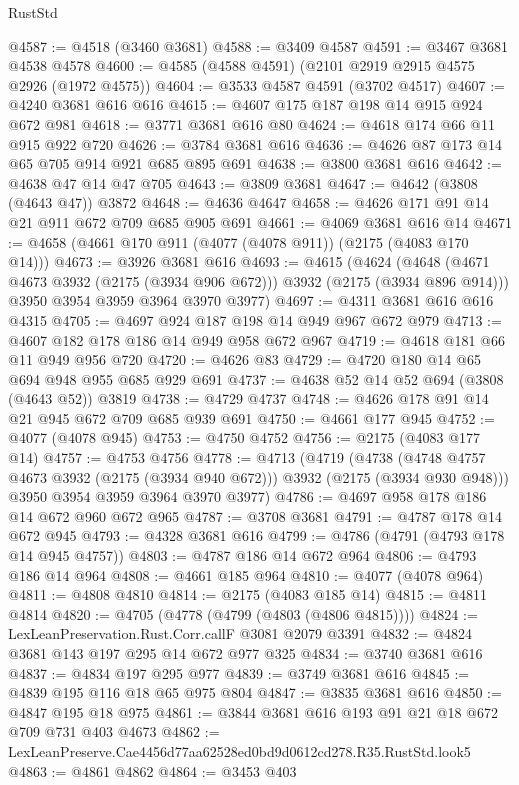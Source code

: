 \begin{lexlean}{RustStd}
\begin{coremodule}
@4587 := @4518 (@3460 @3681)
@4588 := @3409 @4587
@4591 := @3467 @3681 @4538 @4578
@4600 := @4585 (@4588 @4591) (@2101 @2919 @2915 @4575 @2926 (@1972 @4575))
@4604 := @3533 @4587 @4591 (@3702 @4517)
@4607 := @4240 @3681 @616 @616
@4615 := @4607 @175 @187 @198 @14 @915 @924 @672 @981
@4618 := @3771 @3681 @616 @80
@4624 := @4618 @174 @66 @11 @915 @922 @720
@4626 := @3784 @3681 @616
@4636 := @4626 @87 @173 @14 @65 @705 @914 @921 @685 @895 @691
@4638 := @3800 @3681 @616
@4642 := @4638 @47 @14 @47 @705
@4643 := @3809 @3681
@4647 := @4642 (@3808 (@4643 @47)) @3872
@4648 := @4636 @4647
@4658 := @4626 @171 @91 @14 @21 @911 @672 @709 @685 @905 @691
@4661 := @4069 @3681 @616 @14
@4671 := @4658 (@4661 @170 @911 (@4077 (@4078 @911)) (@2175 (@4083 @170 @14)))
@4673 := @3926 @3681 @616
@4693 := @4615
    (@4624
      (@4648 (@4671 @4673 @3932 (@2175 (@3934 @906 @672))) @3932 (@2175 (@3934 @896 @914)))
      @3950
      @3954
      @3959
      @3964
      @3970
      @3977)
@4697 := @4311 @3681 @616 @616 @4315
@4705 := @4697 @924 @187 @198 @14 @949 @967 @672 @979
@4713 := @4607 @182 @178 @186 @14 @949 @958 @672 @967
@4719 := @4618 @181 @66 @11 @949 @956 @720
@4720 := @4626 @83
@4729 := @4720 @180 @14 @65 @694 @948 @955 @685 @929 @691
@4737 := @4638 @52 @14 @52 @694 (@3808 (@4643 @52)) @3819
@4738 := @4729 @4737
@4748 := @4626 @178 @91 @14 @21 @945 @672 @709 @685 @939 @691
@4750 := @4661 @177 @945
@4752 := @4077 (@4078 @945)
@4753 := @4750 @4752
@4756 := @2175 (@4083 @177 @14)
@4757 := @4753 @4756
@4778 := @4713
    (@4719
      (@4738 (@4748 @4757 @4673 @3932 (@2175 (@3934 @940 @672))) @3932 (@2175 (@3934 @930 @948)))
      @3950
      @3954
      @3959
      @3964
      @3970
      @3977)
@4786 := @4697 @958 @178 @186 @14 @672 @960 @672 @965
@4787 := @3708 @3681
@4791 := @4787 @178 @14 @672 @945
@4793 := @4328 @3681 @616
@4799 := @4786 (@4791 (@4793 @178 @14 @945 @4757))
@4803 := @4787 @186 @14 @672 @964
@4806 := @4793 @186 @14 @964
@4808 := @4661 @185 @964
@4810 := @4077 (@4078 @964)
@4811 := @4808 @4810
@4814 := @2175 (@4083 @185 @14)
@4815 := @4811 @4814
@4820 := @4705 (@4778 (@4799 (@4803 (@4806 @4815))))
@4824 := LexLeanPreservation.Rust.Corr.callF @3081 @2079 @3391
@4832 := @4824 @3681 @143 @197 @295 @14 @672 @977 @325
@4834 := @3740 @3681 @616
@4837 := @4834 @197 @295 @977
@4839 := @3749 @3681 @616
@4845 := @4839 @195 @116 @18 @65 @975 @804
@4847 := @3835 @3681 @616
@4850 := @4847 @195 @18 @975
@4861 := @3844 @3681 @616 @193 @91 @21 @18 @672 @709 @731 @403 @4673
@4862 := LexLeanPreserve.Cae4456d77aa62528ed0bd9d0612cd278.R35.RustStd.look5
@4863 := @4861 @4862
@4864 := @3453 @403

\end{coremodule}
\end{lexlean}
